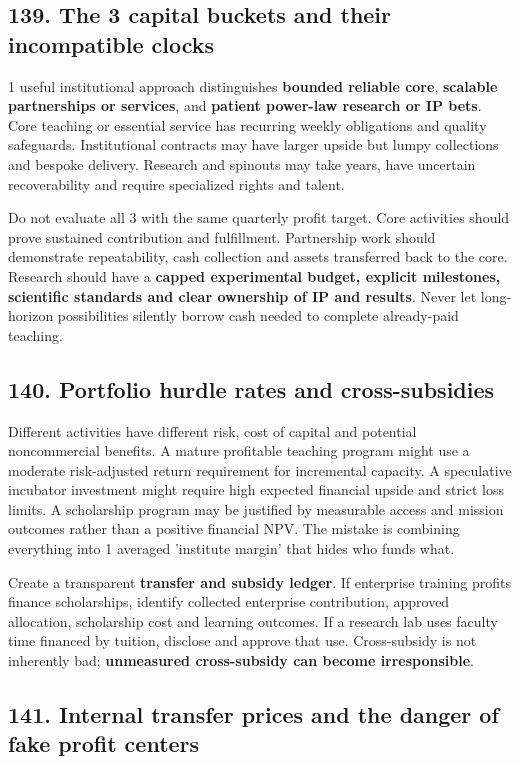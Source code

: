 \subsection{139. The 3 capital buckets and their incompatible clocks}


1 useful institutional approach distinguishes \textbf{bounded reliable core}, \textbf{scalable partnerships or services}, and \textbf{patient power-law research or IP bets}. Core teaching or essential service has recurring weekly obligations and quality safeguards. Institutional contracts may have larger upside but lumpy collections and bespoke delivery. Research and spinouts may take years, have uncertain recoverability and require specialized rights and talent.

Do not evaluate all 3 with the same quarterly profit target. Core activities should prove sustained contribution and fulfillment. Partnership work should demonstrate repeatability, cash collection and assets transferred back to the core. Research should have a \textbf{capped experimental budget, explicit milestones, scientific standards and clear ownership of IP and results}. Never let long-horizon possibilities silently borrow cash needed to complete already-paid teaching.

\subsection{140. Portfolio hurdle rates and cross-subsidies}


Different activities have different risk, cost of capital and potential noncommercial benefits. A mature profitable teaching program might use a moderate risk-adjusted return requirement for incremental capacity. A speculative incubator investment might require high expected financial upside and strict loss limits. A scholarship program may be justified by measurable access and mission outcomes rather than a positive financial NPV. The mistake is combining everything into 1 averaged 'institute margin' that hides who funds what.

Create a transparent \textbf{transfer and subsidy ledger}. If enterprise training profits finance scholarships, identify collected enterprise contribution, approved allocation, scholarship cost and learning outcomes. If a research lab uses faculty time financed by tuition, disclose and approve that use. Cross-subsidy is not inherently bad; \textbf{unmeasured cross-subsidy can become irresponsible}.

\subsection{141. Internal transfer prices and the danger of fake profit centers}



